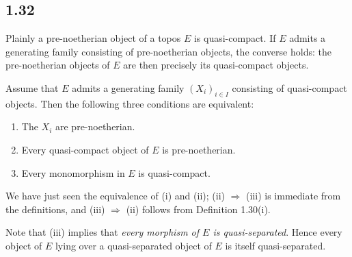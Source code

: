 \documentclass[11pt]{article}
\begin{document}
\subsection*{1.32}
Plainly a pre-noetherian object of a topos \(E\) is quasi-compact. If \(E\) admits a generating family consisting of pre-noetherian objects, the converse holds: the pre-noetherian objects of \(E\) are then precisely its quasi-compact objects.

Assume that \(E\) admits a generating family \((X_i)_{i\in I}\) consisting of quasi-compact objects. Then the following three conditions are equivalent:
\begin{enumerate}[label=(\roman*)]
\item The \(X_i\) are pre-noetherian.
\item Every quasi-compact object of \(E\) is pre-noetherian.
\item Every monomorphism in \(E\) is quasi-compact.
\end{enumerate}
We have just seen the equivalence of (i) and (ii); (ii) \(\Rightarrow\) (iii) is immediate from the definitions, and (iii) \(\Rightarrow\) (ii) follows from Definition 1.30(i).

Note that (iii) implies that \emph{every morphism of \(E\) is quasi-separated}. Hence every object of \(E\) lying over a quasi-separated object of \(E\) is itself quasi-separated.
\end{document}
